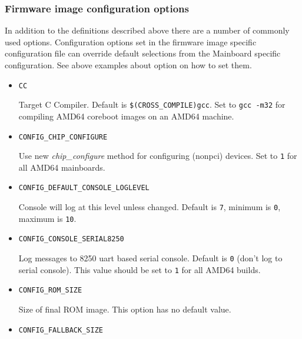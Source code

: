 \documentclass[titlepage,12pt]{article}
\begin{document}
\subsubsection{Firmware image configuration options}
In addition to the definitions described above there are a number of
commonly used options. Configuration options set in the firmware image
specific configuration file can override default selections from the
Mainboard specific configuration.  See above examples about
option on how to set them.

\begin{itemize}

\item \begin{verbatim}CC\end{verbatim}

Target C Compiler. Default is \texttt{\$(CROSS\_COMPILE)gcc}. Set to
\texttt{gcc -m32} for compiling AMD64 coreboot images on an AMD64
machine.

\item \begin{verbatim}CONFIG_CHIP_CONFIGURE \end{verbatim}

Use new \textit{chip\_configure} method for configuring (nonpci)
devices. Set to \texttt{1} for all AMD64 mainboards.

\item \begin{verbatim}CONFIG_DEFAULT_CONSOLE_LOGLEVEL\end{verbatim}

Console will log at this level unless changed. Default is \texttt{7},
minimum is \texttt{0}, maximum is \texttt{10}.

\item \begin{verbatim}CONFIG_CONSOLE_SERIAL8250\end{verbatim}

Log messages to 8250 uart based serial console. Default is \texttt{0}
(don't log to serial console). This value should be set to \texttt{1}
for all AMD64 builds.

\item \begin{verbatim}CONFIG_ROM_SIZE\end{verbatim}

Size of final ROM image. This option has no default value.

\item \begin{verbatim}CONFIG_FALLBACK_SIZE\end{verbatim}


\end{itemize}
\end{document}
